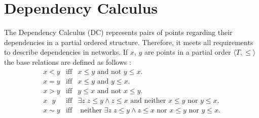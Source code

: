 \section{Dependency Calculus}\label{sec:depcalc}
%


The Dependency Calculus (DC) represents pairs of points regarding their
dependencies in a partial ordered structure.
Therefore, it meets all requirements to describe dependencies in networks.
If $x$, $y$ are points in a partial order $\langle T,\leq\rangle$
the base relations are defined as follows \citep{Ragni05_DepCalc}:
\begin{eqnarray*}
x < y & \text{iff} & x \leq y \text{ and not } y \leq x.\\
x = y & \text{iff} & x \leq y \text{ and } y \leq x.\\
x > y & \text{iff} & y \leq x \text{ and not } x \leq y.\\
x \text{ \^{} } y & \text{iff} & \exists z\; z \leq y \wedge z \leq x \text{ and neither } x \leq y \text{ nor } y \leq x.\\
x \sim y & \text{iff} & \text{ neither } \exists z\;z\leq y \wedge z \leq x \text{ nor } x\leq y \text{ nor } y\leq x .
\end{eqnarray*}

